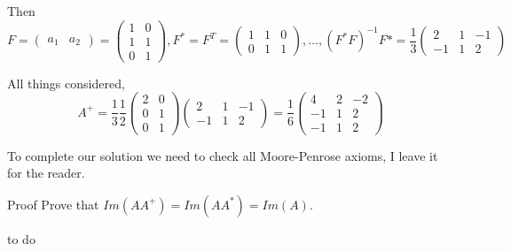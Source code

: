 \documentclass[12pt]{report}
\begin{document}
\begin{solution}
    Then 
    \[ F = 
    \begin{pmatrix}
        a_1 & a_2
    \end{pmatrix}
     = 
     \begin{pmatrix}
         1 & 0\\
         1 & 1\\
         0 & 1
     \end{pmatrix},
     F^{*} = F^T = 
     \begin{pmatrix}
         1 & 1 & 0\\
         0 & 1 & 1
     \end{pmatrix}, \dots, (F^{*}F)^{-1}F{*} = \frac{1}{3}
     \begin{pmatrix}
         2 & 1 & -1\\
         -1 & 1 & 2
     \end{pmatrix}
     \]

    All things considered,
     \[ A^{+} = \frac{1}{3} \frac{1}{2}
     \begin{pmatrix}
        2 & 0\\
        0 & 1\\
        0 & 1
    \end{pmatrix}
     \begin{pmatrix}
         2 & 1 & -1\\
         -1 & 1 & 2
     \end{pmatrix} = \frac{1}{6} 
     \begin{pmatrix}
         4 & 2 & -2\\
         -1 & 1 & 2\\
         -1 & 1 & 2
     \end{pmatrix}
     \]
    
    To complete our solution we need to check all Moore-Penrose axioms, I leave it for the reader.
    \end{solution}
    
    \begin{problem}{Proof}
        Prove that $Im(AA^{+}) = Im(AA^{*}) = Im(A)$.
    \end{problem}
    
    \begin{solution}
        to do
    \end{solution}
\end{document}
